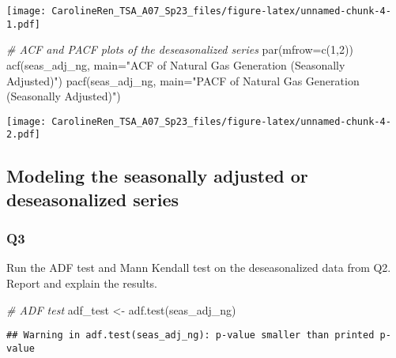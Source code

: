 \documentclass[
]{article}
\newenvironment{Shaded}{\begin{snugshade}}{\end{snugshade}}
\newcommand{\AttributeTok}[1]{\textcolor[rgb]{0.77,0.63,0.00}{#1}}
\newcommand{\CommentTok}[1]{\textcolor[rgb]{0.56,0.35,0.01}{\textit{#1}}}
\newcommand{\DecValTok}[1]{\textcolor[rgb]{0.00,0.00,0.81}{#1}}
\newcommand{\FunctionTok}[1]{\textcolor[rgb]{0.00,0.00,0.00}{#1}}
\newcommand{\NormalTok}[1]{#1}
\newcommand{\OtherTok}[1]{\textcolor[rgb]{0.56,0.35,0.01}{#1}}
\newcommand{\SpecialCharTok}[1]{\textcolor[rgb]{0.00,0.00,0.00}{#1}}
\newcommand{\StringTok}[1]{\textcolor[rgb]{0.31,0.60,0.02}{#1}}
\begin{document}
\texttt{[image: CarolineRen\_TSA\_A07\_Sp23\_files/figure-latex/unnamed-chunk-4-1.pdf]}

\begin{Shaded}
\begin{Highlighting}[]
\CommentTok{\# ACF and PACF plots of the deseasonalized series}
\FunctionTok{par}\NormalTok{(}\AttributeTok{mfrow=}\FunctionTok{c}\NormalTok{(}\DecValTok{1}\NormalTok{,}\DecValTok{2}\NormalTok{))}
\FunctionTok{acf}\NormalTok{(seas\_adj\_ng, }\AttributeTok{main=}\StringTok{"ACF of Natural Gas Generation (Seasonally Adjusted)"}\NormalTok{)}
\FunctionTok{pacf}\NormalTok{(seas\_adj\_ng, }\AttributeTok{main=}\StringTok{"PACF of Natural Gas Generation (Seasonally Adjusted)"}\NormalTok{)}
\end{Highlighting}
\end{Shaded}

\texttt{[image: CarolineRen\_TSA\_A07\_Sp23\_files/figure-latex/unnamed-chunk-4-2.pdf]}

\hypertarget{modeling-the-seasonally-adjusted-or-deseasonalized-series}{%
\subsection{Modeling the seasonally adjusted or deseasonalized
series}\label{modeling-the-seasonally-adjusted-or-deseasonalized-series}}

\hypertarget{q3}{%
\subsubsection{Q3}\label{q3}}

Run the ADF test and Mann Kendall test on the deseasonalized data from
Q2. Report and explain the results.

\begin{Shaded}
\begin{Highlighting}[]
\CommentTok{\# ADF test}
\NormalTok{adf\_test }\OtherTok{\textless{}{-}} \FunctionTok{adf.test}\NormalTok{(seas\_adj\_ng)}
\end{Highlighting}
\end{Shaded}

\begin{verbatim}
## Warning in adf.test(seas_adj_ng): p-value smaller than printed p-value
\end{verbatim}

\begin{Shaded}
\end{Shaded}
\end{document}
